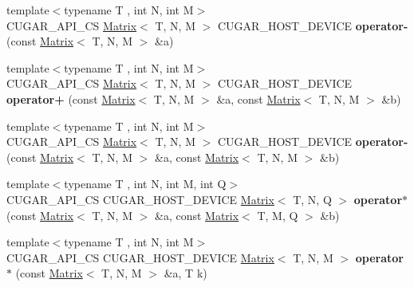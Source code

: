 \begin{DoxyCompactItemize}
\item 
\mbox{\label{namespacecugar_aa5ac90984fa2b309627aa5e43180905c}} 
{\footnotesize template$<$typename T , int N, int M$>$ }\\C\+U\+G\+A\+R\+\_\+\+A\+P\+I\+\_\+\+CS \hyperlink{structcugar_1_1_matrix}{Matrix}$<$ T, N, M $>$ C\+U\+G\+A\+R\+\_\+\+H\+O\+S\+T\+\_\+\+D\+E\+V\+I\+CE {\bfseries operator-\/} (const \hyperlink{structcugar_1_1_matrix}{Matrix}$<$ T, N, M $>$ \&a)
\item 
\mbox{\label{namespacecugar_a28fd57a8159fd6eb9405db14c9317817}} 
{\footnotesize template$<$typename T , int N, int M$>$ }\\C\+U\+G\+A\+R\+\_\+\+A\+P\+I\+\_\+\+CS \hyperlink{structcugar_1_1_matrix}{Matrix}$<$ T, N, M $>$ C\+U\+G\+A\+R\+\_\+\+H\+O\+S\+T\+\_\+\+D\+E\+V\+I\+CE {\bfseries operator+} (const \hyperlink{structcugar_1_1_matrix}{Matrix}$<$ T, N, M $>$ \&a, const \hyperlink{structcugar_1_1_matrix}{Matrix}$<$ T, N, M $>$ \&b)
\item 
\mbox{\label{namespacecugar_a2b0e08bdb993813fa2a93db809e9adf4}} 
{\footnotesize template$<$typename T , int N, int M$>$ }\\C\+U\+G\+A\+R\+\_\+\+A\+P\+I\+\_\+\+CS \hyperlink{structcugar_1_1_matrix}{Matrix}$<$ T, N, M $>$ C\+U\+G\+A\+R\+\_\+\+H\+O\+S\+T\+\_\+\+D\+E\+V\+I\+CE {\bfseries operator-\/} (const \hyperlink{structcugar_1_1_matrix}{Matrix}$<$ T, N, M $>$ \&a, const \hyperlink{structcugar_1_1_matrix}{Matrix}$<$ T, N, M $>$ \&b)
\item 
{\footnotesize template$<$typename T , int N, int M, int Q$>$ }\\C\+U\+G\+A\+R\+\_\+\+A\+P\+I\+\_\+\+CS C\+U\+G\+A\+R\+\_\+\+H\+O\+S\+T\+\_\+\+D\+E\+V\+I\+CE \hyperlink{structcugar_1_1_matrix}{Matrix}$<$ T, N, Q $>$ {\bfseries operator$\ast$} (const \hyperlink{structcugar_1_1_matrix}{Matrix}$<$ T, N, M $>$ \&a, const \hyperlink{structcugar_1_1_matrix}{Matrix}$<$ T, M, Q $>$ \&b)
\item 
\mbox{\label{namespacecugar_a15506d9ed91a834f4cac6883e23f52ae}} 
{\footnotesize template$<$typename T , int N, int M$>$ }\\C\+U\+G\+A\+R\+\_\+\+A\+P\+I\+\_\+\+CS C\+U\+G\+A\+R\+\_\+\+H\+O\+S\+T\+\_\+\+D\+E\+V\+I\+CE \hyperlink{structcugar_1_1_matrix}{Matrix}$<$ T, N, M $>$ {\bfseries operator$\ast$} (const \hyperlink{structcugar_1_1_matrix}{Matrix}$<$ T, N, M $>$ \&a, T k)

\end{DoxyCompactItemize}
